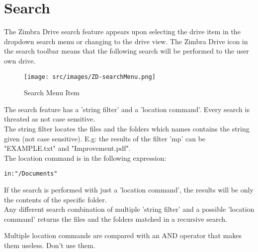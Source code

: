 \section{Search}
The Zimbra Drive search feature appears upon selecting the drive item in the dropdown search menu or changing to the drive view.
The Zimbra Drive icon in the search toolbar means that the following search will be performed to the user own drive.
\begin{figure}[htbp,!h] 
\centering 
\texttt{[image: src/images/ZD-searchMenu.png]} 
\caption{Search Menu Item} 
\label{==fig:searchMenu==}
\end{figure}

The search feature has a 'string filter' and a 'location command'. 
Every search is threated as not case sensitive. \\
The string filter locates the files and the folders which names contains the string given (not case sensitive).
E.g: the results of the filter 'mp' can be "EXAMPLE.txt" and "Improvement.pdf".\\

The location command is in the following expression:
\begin{verbatim}
in:"/Documents"
\end{verbatim}
If the search is performed with just a 'location command', the results will be only the contents of the specific folder.\\

Any different search combination of multiple 'string filter' and a possible 'location command' returns 
the files and the folders matched in a recursive search.

\begin{warning}
    Multiple location commands are compared with an AND operator that makes them useless. Don't use them.
\end{warning}
